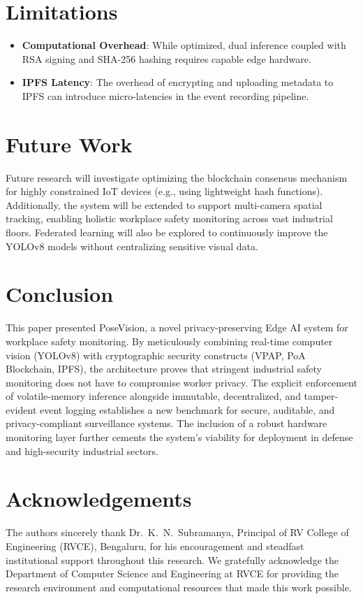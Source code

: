 \documentclass[conference]{IEEEtran}
\begin{document}
\section{Limitations}
\begin{itemize}
    \item \textbf{Computational Overhead}: While optimized, dual inference coupled with RSA signing and SHA-256 hashing requires capable edge hardware.
    \item \textbf{IPFS Latency}: The overhead of encrypting and uploading metadata to IPFS can introduce micro-latencies in the event recording pipeline.
\end{itemize}

\section{Future Work}
Future research will investigate optimizing the blockchain consensus mechanism for highly constrained IoT devices (e.g., using lightweight hash functions). Additionally, the system will be extended to support multi-camera spatial tracking, enabling holistic workplace safety monitoring across vast industrial floors. Federated learning will also be explored to continuously improve the YOLOv8 models without centralizing sensitive visual data.

\section{Conclusion}
This paper presented PoseVision, a novel privacy-preserving Edge AI system for workplace safety monitoring. By meticulously combining real-time computer vision (YOLOv8) with cryptographic security constructs (VPAP, PoA Blockchain, IPFS), the architecture proves that stringent industrial safety monitoring does not have to compromise worker privacy. The explicit enforcement of volatile-memory inference alongside immutable, decentralized, and tamper-evident event logging establishes a new benchmark for secure, auditable, and privacy-compliant surveillance systems. The inclusion of a robust hardware monitoring layer further cements the system's viability for deployment in defense and high-security industrial sectors.

\section*{Acknowledgements}
The authors sincerely thank Dr.~K.~N.~Subramanya, Principal of RV College of Engineering (RVCE), Bengaluru, for his encouragement and steadfast institutional support throughout this research. We gratefully acknowledge the Department of Computer Science and Engineering at RVCE for providing the research environment and computational resources that made this work possible.
\end{document}
